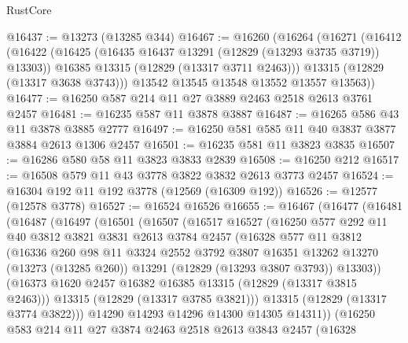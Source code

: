 \begin{lexlean}{RustCore}
\begin{coremodule}
@16437 := @13273 (@13285 @344)
@16467 := @16260
    (@16264
      (@16271
        (@16412
          (@16422
            (@16425 (@16435 @16437 @13291 (@12829 (@13293 @3735 @3719)) @13303))
            @16385
            @13315
            (@12829 (@13317 @3711 @2463)))
          @13315
          (@12829 (@13317 @3638 @3743)))
        @13542
        @13545
        @13548
        @13552
        @13557
        @13563))
@16477 := @16250 @587 @214 @11 @27 @3889 @2463 @2518 @2613 @3761 @2457
@16481 := @16235 @587 @11 @3878 @3887
@16487 := @16265 @586 @43 @11 @3878 @3885 @2777
@16497 := @16250 @581 @585 @11 @40 @3837 @3877 @3884 @2613 @1306 @2457
@16501 := @16235 @581 @11 @3823 @3835
@16507 := @16286 @580 @58 @11 @3823 @3833 @2839
@16508 := @16250 @212
@16517 := @16508 @579 @11 @43 @3778 @3822 @3832 @2613 @3773 @2457
@16524 := @16304 @192 @11 @192 @3778 (@12569 (@16309 @192))
@16526 := @12577 (@12578 @3778)
@16527 := @16524 @16526
@16655 := @16467
    (@16477
      (@16481
        (@16487
          (@16497
            (@16501
              (@16507
                (@16517
                  @16527
                  (@16250
                    @577
                    @292
                    @11
                    @40
                    @3812
                    @3821
                    @3831
                    @2613
                    @3784
                    @2457
                    (@16328
                      @577
                      @11
                      @3812
                      (@16336
                        @260
                        @98
                        @11
                        @3324
                        @2552
                        @3792
                        @3807
                        @16351
                        @13262
                        @13270
                        (@13273 (@13285 @260))
                        @13291
                        (@12829 (@13293 @3807 @3793))
                        @13303))
                    (@16373 @1620 @2457 @16382 @16385 @13315 (@12829 (@13317 @3815 @2463)))
                    @13315
                    (@12829 (@13317 @3785 @3821)))
                  @13315
                  (@12829 (@13317 @3774 @3822)))
                @14290
                @14293
                @14296
                @14300
                @14305
                @14311))
            (@16250
              @583
              @214
              @11
              @27
              @3874
              @2463
              @2518
              @2613
              @3843
              @2457
              (@16328

\end{coremodule}
\end{lexlean}
